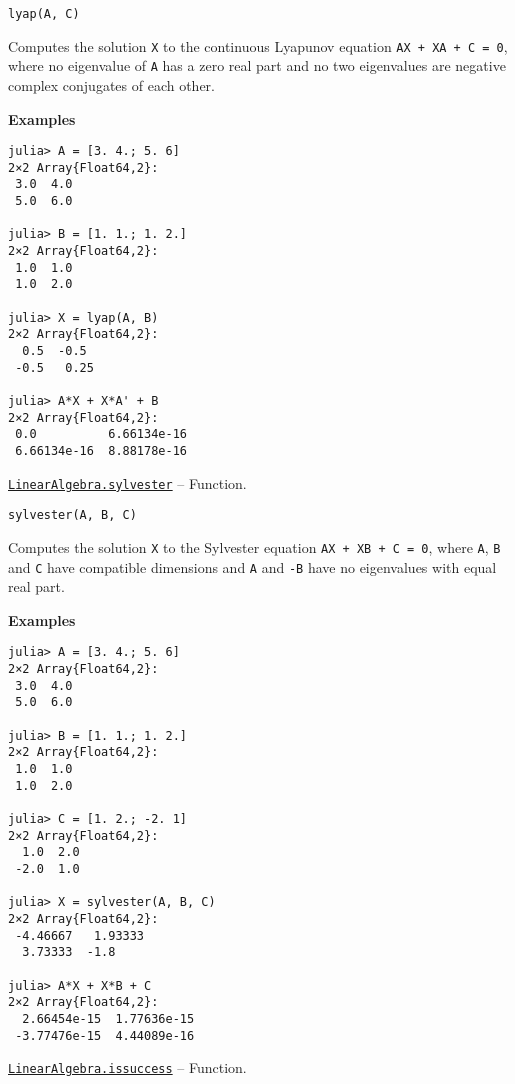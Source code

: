 \begin{adjustwidth}{2em}{0pt}


\begin{verbatim}
lyap(A, C)
\end{verbatim}

Computes the solution \texttt{X} to the continuous Lyapunov equation \texttt{AX + XA{\textquotesingle} + C = 0}, where no eigenvalue of \texttt{A} has a zero real part and no two eigenvalues are negative complex conjugates of each other.

\textbf{Examples}


\begin{verbatim}
julia> A = [3. 4.; 5. 6]
2×2 Array{Float64,2}:
 3.0  4.0
 5.0  6.0

julia> B = [1. 1.; 1. 2.]
2×2 Array{Float64,2}:
 1.0  1.0
 1.0  2.0

julia> X = lyap(A, B)
2×2 Array{Float64,2}:
  0.5  -0.5
 -0.5   0.25

julia> A*X + X*A' + B
2×2 Array{Float64,2}:
 0.0          6.66134e-16
 6.66134e-16  8.88178e-16
\end{verbatim}



\end{adjustwidth}
\hypertarget{1947738214979807634}{} 
\hyperlink{1947738214979807634}{\texttt{LinearAlgebra.sylvester}}  -- {Function.}

\begin{adjustwidth}{2em}{0pt}


\begin{verbatim}
sylvester(A, B, C)
\end{verbatim}

Computes the solution \texttt{X} to the Sylvester equation \texttt{AX + XB + C = 0}, where \texttt{A}, \texttt{B} and \texttt{C} have compatible dimensions and \texttt{A} and \texttt{-B} have no eigenvalues with equal real part.

\textbf{Examples}


\begin{verbatim}
julia> A = [3. 4.; 5. 6]
2×2 Array{Float64,2}:
 3.0  4.0
 5.0  6.0

julia> B = [1. 1.; 1. 2.]
2×2 Array{Float64,2}:
 1.0  1.0
 1.0  2.0

julia> C = [1. 2.; -2. 1]
2×2 Array{Float64,2}:
  1.0  2.0
 -2.0  1.0

julia> X = sylvester(A, B, C)
2×2 Array{Float64,2}:
 -4.46667   1.93333
  3.73333  -1.8

julia> A*X + X*B + C
2×2 Array{Float64,2}:
  2.66454e-15  1.77636e-15
 -3.77476e-15  4.44089e-16
\end{verbatim}



\end{adjustwidth}
\hypertarget{10694198281534172656}{} 
\hyperlink{10694198281534172656}{\texttt{LinearAlgebra.issuccess}}  -- {Function.}

